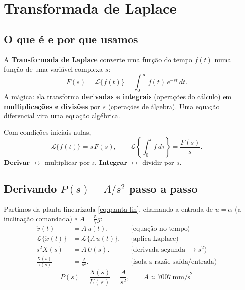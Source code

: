 \chapter{Transformada de Laplace}\label{cap:laplace}

\section{O que \'e e por que usamos}
A \textbf{Transformada de Laplace} converte uma fun\c{c}\~ao do tempo $f(t)$ numa
fun\c{c}\~ao de uma vari\'avel complexa $s$:
\begin{equation}
F(s) = \mathcal{L}\{f(t)\} = \int_0^{\infty} f(t)\,e^{-st}\,dt.
\end{equation}
A m\'agica: ela transforma \textbf{derivadas e integrais} (opera\c{c}\~oes do
c\'alculo) em \textbf{multiplica\c{c}\~oes e divis\~oes} por $s$ (opera\c{c}\~oes de
\'algebra). Uma equa\c{c}\~ao diferencial vira uma equa\c{c}\~ao alg\'ebrica.

\begin{conceito}
Com condi\c{c}\~oes iniciais nulas,
\[
\mathcal{L}\{\dot f(t)\} = s\,F(s), \qquad
\mathcal{L}\!\left\{\textstyle\int_0^t f\,d\tau\right\} = \frac{F(s)}{s}.
\]
\textbf{Derivar} $\leftrightarrow$ multiplicar por $s$. \textbf{Integrar}
$\leftrightarrow$ dividir por $s$.
\end{conceito}

\section{Derivando $P(s)=A/s^2$ passo a passo}
Partimos da planta linearizada \eqref{eq:planta-lin}, chamando a entrada de
$u=\alpha$ (a inclina\c{c}\~ao comandada) e $A=\tfrac{5}{7}g$:
\begin{align}
\ddot{x}(t) &= A\,u(t). &&\text{(equa\c{c}\~ao no tempo)}\\
\mathcal{L}\{\ddot{x}(t)\} &= \mathcal{L}\{A\,u(t)\}. &&\text{(aplica Laplace)}\\
s^2 X(s) &= A\,U(s). &&\text{(derivada segunda }\to s^2)\\
\frac{X(s)}{U(s)} &= \frac{A}{s^2}. &&\text{(isola a raz\~ao sa\'ida/entrada)}
\end{align}
\begin{equation}
\boxed{\ P(s)=\dfrac{X(s)}{U(s)}=\dfrac{A}{s^{2}},\qquad A\approx 7007\ \text{mm/s}^2\ }
\label{eq:plant}
\end{equation}

